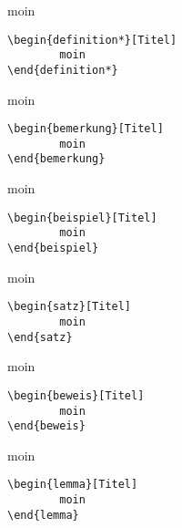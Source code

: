 \begingroup\begin{definition*}[Titel]
moin
\begin{lstlisting}[language=lLatex]
\begin{definition*}[Titel]
        moin
\end{definition*}\end{lstlisting}
\end{definition*}\endgroup

\begingroup\begin{bemerkung}[Titel]
moin
\begin{lstlisting}[language=lLatex]
\begin{bemerkung}[Titel]
        moin
\end{bemerkung}\end{lstlisting}
\end{bemerkung}\endgroup

\begingroup\begin{beispiel}[Titel]
moin
\begin{lstlisting}[language=lLatex]
\begin{beispiel}[Titel]
        moin
\end{beispiel}\end{lstlisting}
\end{beispiel}\endgroup

\begingroup\begin{satz}[Titel]
moin
\begin{lstlisting}[language=lLatex]
\begin{satz}[Titel]
        moin
\end{satz}\end{lstlisting}
\end{satz}\endgroup


\begingroup\begin{beweis}[Titel]
moin
\begin{lstlisting}[language=lLatex]
\begin{beweis}[Titel]
        moin
\end{beweis}\end{lstlisting}
\end{beweis}\endgroup

\begingroup\begin{lemma}[Titel]
moin
\begin{lstlisting}[language=lLatex]
\begin{lemma}[Titel]
        moin
\end{lemma}\end{lstlisting}
\end{lemma}\endgroup

